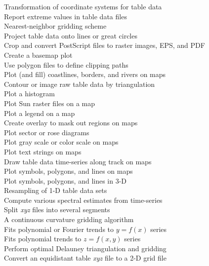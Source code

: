 \begin{tabbing}
	\>	Transformation of coordinate systems for table data \\ 
	\>	Report extreme values in table data files \\ 
	\>	Nearest-neighbor gridding scheme \\ 
	\>	Project table data onto lines or great circles \\ 
	\>	Crop and convert PostScript files to raster images, EPS, and PDF \\
	\>	Create a basemap plot \\ 
	\>	Use polygon files to define clipping paths \\ 
	\>	Plot (and fill) coastlines, borders, and rivers on maps \\ 
	\>	Contour or image raw table data by triangulation \\ 
	\>	Plot a histogram \\ 
	\>	Plot Sun raster files on a map \\ 
	\>	Plot a legend on a map \\ 
	\>	Create overlay to mask out regions on maps \\ 
	\>	Plot sector or rose diagrams \\ 
	\>	Plot gray scale or color scale on maps \\ 
	\>	Plot text strings on maps \\ 
	\>	Draw table data time-series along track on maps \\ 
		\>	Plot symbols, polygons, and lines on maps \\ 
		\>	Plot symbols, polygons, and lines in 3-D \\ 
	\>	Resampling of 1-D table data sets \\ 
	\>	Compute various spectral estimates from time-series \\ 
	\>	Split \emph{xyz} files into several segments \\ 
	\>	A continuous curvature gridding algorithm \\ 
	\>	Fits polynomial or Fourier trends to $y = f(x)$ series \\ 
	\>	Fits polynomial trends to $z = f(x,y)$ series \\ 
	\>	Perform optimal Delauney triangulation and gridding \\ 
	\>	Convert an equidistant table \emph{xyz} file to a 2-D grid file
\end{tabbing}

